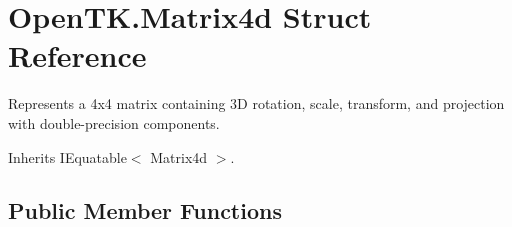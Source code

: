 \hypertarget{struct_open_t_k_1_1_matrix4d}{\section{Open\-T\-K.\-Matrix4d Struct Reference}
\label{struct_open_t_k_1_1_matrix4d}
}


Represents a 4x4 matrix containing 3\-D rotation, scale, transform, and projection with double-\/precision components.  




Inherits I\-Equatable$<$ Matrix4d $>$.

\subsection*{Public Member Functions}
